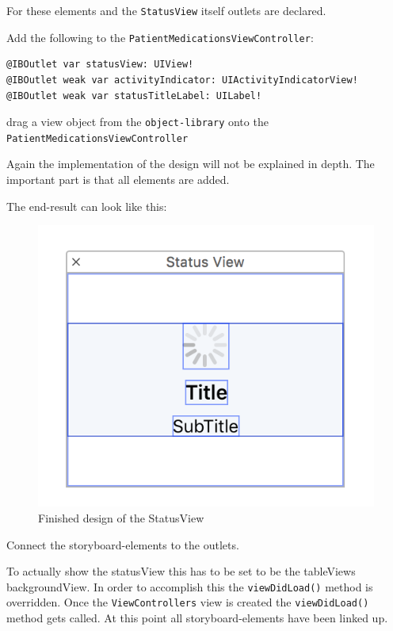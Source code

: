 \documentclass{article}
\begin{document}
For these elements and the \texttt{StatusView} itself outlets are declared.

Add the following to the \texttt{PatientMedicationsViewController}:

\begin{verbatim}
@IBOutlet var statusView: UIView!
@IBOutlet weak var activityIndicator: UIActivityIndicatorView!
@IBOutlet weak var statusTitleLabel: UILabel!
\end{verbatim}
drag a view object from the \texttt{object-library} onto the
\texttt{PatientMedicationsViewController}

Again the implementation of the design will not be explained in depth.
The important part is that all elements are added.

The end-result can look like this:

\begin{figure}[H]
\centering
\includegraphics{resources/step6/statusview.png}
\caption{Finished design of the StatusView}
\label{fig:statusview}
\end{figure}
Connect the storyboard-elements to the outlets.

To actually show the statusView this has to be set to be the tableViews
backgroundView. In order to accomplish this the \texttt{viewDidLoad()}
method is overridden. Once the \texttt{ViewControllers} view is created
the \texttt{viewDidLoad()} method gets called. At this point all
storyboard-elements have been linked up.
\end{document}
